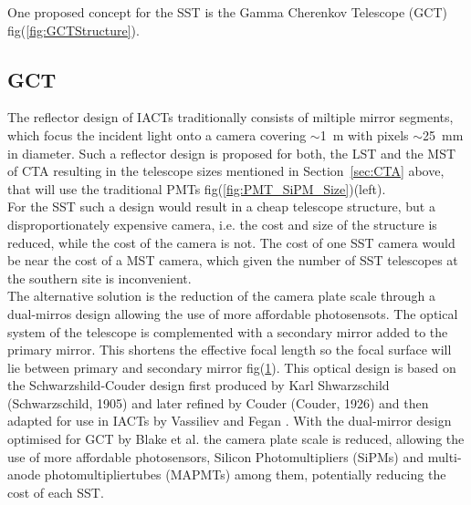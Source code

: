 \documentclass[12pt,article,type=msc,colorback,accentcolor=tud9c]{tudthesis}
\begin{document}
One proposed concept for the SST is the Gamma Cherenkov Telescope (GCT) fig(\ref{fig:GCTStructure}).\\

\subsection{GCT}
\begin{figure}[t!]
\begin{centering}
\caption{}
\label{fig:GCT_Focal}
\end{centering}
\end{figure}
The reflector design of IACTs traditionally consists of miltiple mirror segments, which focus the incident light onto a camera covering $\sim$1~m with pixels $\sim$25~mm in diameter. Such a reflector design is proposed for both, the LST and the MST of CTA resulting in the telescope sizes mentioned in Section~{\ref{sec:CTA}} above, that will use the traditional PMTs fig(\ref{fig:PMT_SiPM_Size})(left).\\
For the SST such a design would result in a cheap telescope structure, but a disproportionately expensive camera, i.e. the cost and size of the structure is reduced, while the cost of the camera is not. The cost of one SST camera would be near the cost of a MST camera, which given the number of SST telescopes at the southern site is inconvenient.\\
The alternative solution is the reduction of the camera plate scale through a dual-mirros design allowing the use of more affordable photosensots. The optical system of the telescope is complemented with a secondary mirror added to the primary mirror. This shortens the effective focal length so the focal surface will lie between primary and secondary mirror fig(\ref{fig:GCT_Focal}). This optical design is based on the Schwarzshild-Couder design first produced by Karl Shwarzschild (Schwarzschild, 1905) and later refined by Couder (Couder, 1926) and then adapted for use in IACTs by Vassiliev and Fegan \cite{FeganVassiliev}. With the dual-mirror design optimised for GCT by Blake et al. \cite{SSTGATE} the camera plate scale is reduced, allowing the use of more affordable photosensors, Silicon Photomultipliers (SiPMs) and multi-anode photomultipliertubes (MAPMTs) among them, potentially reducing the cost of each SST.
\end{document}
